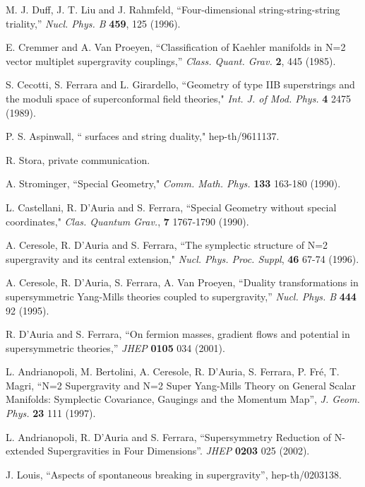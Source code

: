 \documentclass[a4paper,12pt]{article}
\begin{document}
\begin{thebibliography}{99}
 M. J. Duff, J. T. Liu and J. Rahmfeld,
``Four-dimensional string-string-string triality,'' {\it Nucl.
Phys. B}  {\bf 459}, 125 (1996).

E. Cremmer and A. Van Proeyen, ``Classification of Kaehler
manifolds in N=2 vector multiplet supergravity couplings,'' {\it
Class. Quant. Grav.}  {\bf 2}, 445 (1985).



 S. Cecotti, S. Ferrara and L. Girardello, ``Geometry
of type IIB superstrings and the moduli space of superconformal
field theories," {\it Int. J. of Mod. Phys.} {\bf 4} 2475 (1989).

 P. S. Aspinwall, ``\myHighlight{$\K$}\coordHE{} surfaces and string duality,"
hep-th/9611137.

 R. Stora, private communication.

 A. Strominger, ``Special Geometry," {\it Comm. Math.
Phys.} {\bf 133} 163-180 (1990).

 L. Castellani, R. D'Auria and S. Ferrara, ``Special
Geometry without special coordinates," {\it Clas. Quantum Grav.},
{\bf 7} 1767-1790 (1990).

 A. Ceresole, R. D'Auria and S. Ferrara,
``The symplectic structure of N=2 supergravity and its central
extension," {\it Nucl. Phys. Proc. Suppl}, {\bf 46} 67-74 (1996).

A. Ceresole, R. D'Auria, S. Ferrara, A. Van Proeyen, ``Duality
transformations in supersymmetric Yang-Mills theories coupled to
supergravity,'' {\it Nucl. Phys.  B} {\bf 444} 92 (1995).


 R. D'Auria and S. Ferrara, ``On fermion masses,
gradient flows and potential in supersymmetric  theories,''
{\it JHEP} {\bf 0105} 034 (2001).

L. Andrianopoli, M. Bertolini, A. Ceresole, R. D'Auria, S.
Ferrara, P. Fr\'e, T. Magri, ``N=2 Supergravity and N=2 Super
Yang-Mills Theory on General Scalar Manifolds: Symplectic
Covariance, Gaugings and the Momentum Map'', {\it  J. Geom. Phys.}
{\bf 23} 111 (1997).

L. Andrianopoli, R. D'Auria and S. Ferrara, ``Supersymmetry
Reduction of N-extended Supergravities in Four  Dimensions''. {\it
JHEP} {\bf 0203} 025 (2002).

 J. Louis,
``Aspects of spontaneous \coordHE{} breaking in
supergravity'', hep-th/0203138.


\end{thebibliography}
\end{document}
